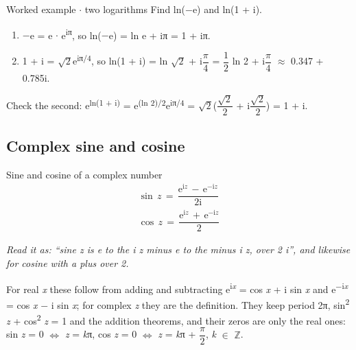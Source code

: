 \documentclass[11pt]{article}
\begin{document}
\begin{keepsection}
\begin{keepsection}
\begin{workedbox}{Worked example \ensuremath{\cdot} two logarithms}
Find ln(\ensuremath{-}e) and ln(1 + i).

\begin{enumerate}
\item \ensuremath{-}e = e \ensuremath{\cdot} e\textsuperscript{iπ}, so ln(\ensuremath{-}e) = ln e + iπ = 1 + iπ.
\item 1 + i = \ensuremath{\sqrt{2}}e\textsuperscript{iπ/4}, so ln(1 + i) = ln \ensuremath{\sqrt{2}} + i{\small\ensuremath{\dfrac{π}{4}}} = {\small\ensuremath{\dfrac{1}{2}}} ln 2 + i{\small\ensuremath{\dfrac{π}{4}}} \ensuremath{\approx} 0.347 + 0.785i.
\end{enumerate}

Check the second: e\textsuperscript{ln(1 + i)} = e\textsuperscript{(ln 2)/2}e\textsuperscript{iπ/4} = \ensuremath{\sqrt{2}}({\small\ensuremath{\dfrac{\sqrt{2}}{2}}} + i{\small\ensuremath{\dfrac{\sqrt{2}}{2}}}) = 1 + i.
\end{workedbox}
\end{keepsection}

\begin{keepsection}
\subsection{Complex sine and cosine}

\begin{equationcard}{Sine and cosine of a complex number}
\[ \begin{gathered} \sin \, {z}\, =\, \dfrac{\mathrm{e}^{\mathrm{i}{z}}\, -\, \mathrm{e}^{-\mathrm{i}{z}}}{2\mathrm{i}} \\ \cos \, {z}\, =\, \dfrac{\mathrm{e}^{\mathrm{i}{z}}\, +\, \mathrm{e}^{-\mathrm{i}{z}}}{2} \end{gathered} \]
{\small \emph{Read it as: “sine z is e to the i z minus e to the minus i z, over 2 i”, and likewise for cosine with a plus over 2.}\par For real \textit{x} these follow from adding and subtracting e\textsuperscript{i\textit{x}} = cos \textit{x} + i sin \textit{x} and e\textsuperscript{\ensuremath{-}i\textit{x}} = cos \textit{x} \ensuremath{-} i sin \textit{x}; for complex \textit{z} they are the definition. They keep period 2π, sin\textsuperscript{2} \textit{z} + cos\textsuperscript{2} \textit{z} = 1 and the addition theorems, and their zeros are only the real ones: sin \textit{z} = 0 \ensuremath{\Leftrightarrow} \textit{z} = \textit{k}π, cos \textit{z} = 0 \ensuremath{\Leftrightarrow} \textit{z} = \textit{k}π + {\small\ensuremath{\dfrac{π}{2}}}, \textit{k} \ensuremath{\in} \ensuremath{\mathbb{Z}}.}
\end{equationcard}


\end{keepsection}
\end{keepsection}
\end{document}
